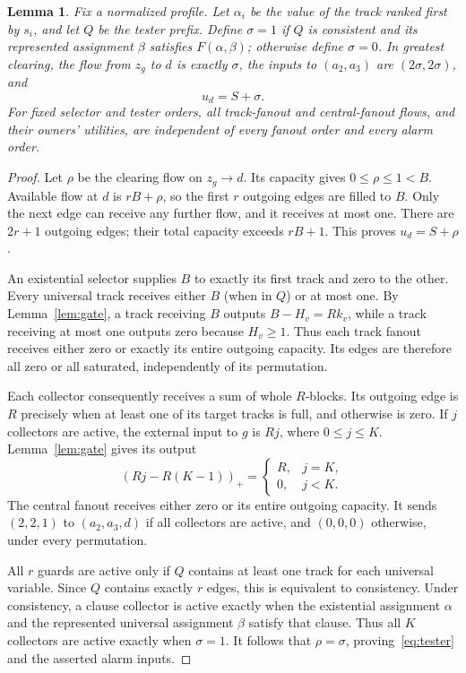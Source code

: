 \documentclass[11pt]{article}
\newtheorem{lemma}[theorem]{Lemma}
\newcommand{\pos}[1]{(#1)_+}
\begin{document}
\begin{lemma}\label{lem:signals}
Fix a normalized profile. Let $\alpha_i$ be the value of the track ranked first by $s_i$, and let $Q$ be the tester prefix. Define $\sigma=1$ if $Q$ is consistent and its represented assignment $\beta$ satisfies $F(\alpha,\beta)$; otherwise define $\sigma=0$. In greatest clearing, the flow from $z_g$ to $d$ is exactly $\sigma$, the inputs to $(a_2,a_3)$ are $(2\sigma,2\sigma)$, and
\begin{equation}\label{eq:tester}
 u_d=S+\sigma.
\end{equation}
For fixed selector and tester orders, all track-fanout and central-fanout flows, and their owners' utilities, are independent of every fanout order and every alarm order.
\end{lemma}
\begin{proof}
Let $\rho$ be the clearing flow on $z_g\to d$. Its capacity gives $0\le\rho\le1<B$. Available flow at $d$ is $rB+\rho$, so the first $r$ outgoing edges are filled to $B$. Only the next edge can receive any further flow, and it receives at most one. There are $2r+1$ outgoing edges; their total capacity exceeds $rB+1$. This proves $u_d=S+\rho$.

An existential selector supplies $B$ to exactly its first track and zero to the other. Every universal track receives either $B$ (when in $Q$) or at most one. By Lemma~\ref{lem:gate}, a track receiving $B$ outputs $B-H_v=Rk_v$, while a track receiving at most one outputs zero because $H_v\ge1$. Thus each track fanout receives either zero or exactly its entire outgoing capacity. Its edges are therefore all zero or all saturated, independently of its permutation.

Each collector consequently receives a sum of whole $R$-blocks. Its outgoing edge is $R$ precisely when at least one of its target tracks is full, and otherwise is zero. If $j$ collectors are active, the external input to $g$ is $Rj$, where $0\le j\le K$. Lemma~\ref{lem:gate} gives its output
\[
 \pos{Rj-R(K-1)}=
 \begin{cases}R,&j=K,\\0,&j<K.\end{cases}
\]
The central fanout receives either zero or its entire outgoing capacity. It sends $(2,2,1)$ to $(a_2,a_3,d)$ if all collectors are active, and $(0,0,0)$ otherwise, under every permutation.

All $r$ guards are active only if $Q$ contains at least one track for each universal variable. Since $Q$ contains exactly $r$ edges, this is equivalent to consistency. Under consistency, a clause collector is active exactly when the existential assignment $\alpha$ and the represented universal assignment $\beta$ satisfy that clause. Thus all $K$ collectors are active exactly when $\sigma=1$. It follows that $\rho=\sigma$, proving~\eqref{eq:tester} and the asserted alarm inputs.


\end{proof}
\end{document}
